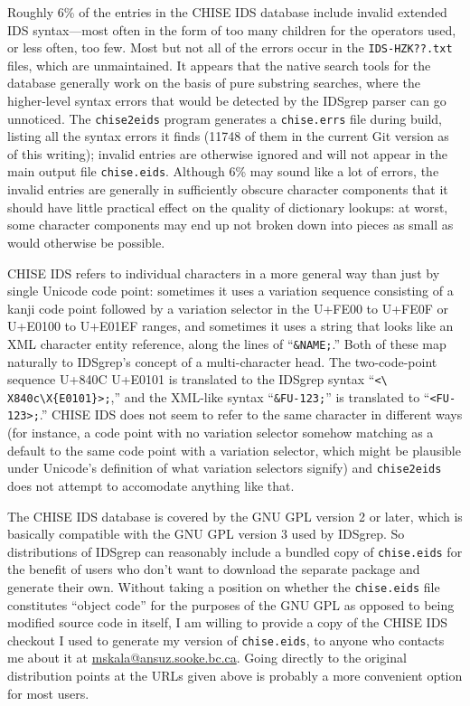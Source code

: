 \documentclass[twocolumn]{report}
\begin{document}
Roughly 6\% of the entries in the CHISE IDS database include invalid
extended IDS syntax---most often in the form of too many children for the
operators used, or less often, too few.  Most but not all of the errors
occur in the \texttt{IDS-HZK??.txt} files, which are unmaintained.  It
appears that the native search tools for the database generally work on the
basis of pure substring searches, where the higher-level syntax errors that
would be detected by the IDSgrep parser can go unnoticed.  The
\texttt{chise2eids} program generates a \texttt{chise.errs} file during
build, listing all the syntax errors it finds (11748 of them in the current
Git version as of this writing); invalid entries are otherwise ignored and
will not appear in the main output file \texttt{chise.eids}.  Although 6\%
may sound like a lot of errors, the invalid entries are generally in
sufficiently obscure character components that it should have little
practical effect on the quality of dictionary lookups: at worst, some
character components may end up not broken down into pieces as small as
would otherwise be possible.

CHISE IDS refers to individual characters in a more general way than just by
single Unicode code point: sometimes it uses a variation sequence consisting
of a kanji code point followed by a variation selector in the U+FE00 to
U+FE0F or U+E0100 to U+E01EF ranges, and sometimes it uses a string that
looks like an XML character entity reference, along the lines of
``\texttt{\&NAME;}.'' Both of these map naturally to IDSgrep's concept of a
multi-character head.  The two-code-point sequence U+840C U+E0101 is
translated to the IDSgrep syntax ``\texttt{<\textbackslash%
X840c\textbackslash X\{E0101\}>;},'' and the XML-like syntax
``\texttt{\&FU-123;}'' is translated to ``\texttt{<FU-123>;}.'' CHISE IDS
does not seem to refer to the same character in different ways (for
instance, a code point with no variation selector somehow matching as a
default to the same code point with a variation selector, which might be
plausible under Unicode's definition of what variation selectors signify)
and \texttt{chise2eids} does not attempt to accomodate anything like that.

The CHISE IDS database is covered by the GNU GPL version 2 or later, which
is basically compatible with the GNU GPL version 3 used by IDSgrep.  So
distributions of IDSgrep can reasonably include a bundled copy of
\texttt{chise.eids} for the benefit of users who don't want to download the
separate package and generate their own.  Without taking a position on
whether the \texttt{chise.eids} file constitutes ``object code'' for the
purposes of the GNU GPL as opposed to being modified source code in itself,
I am willing to provide a copy of the CHISE IDS checkout I used to generate
my version of \texttt{chise.eids}, to anyone who contacts me about it at
\url{mskala@ansuz.sooke.bc.ca}.  Going directly to the original distribution
points at the URLs given above is probably a more convenient option for most
users.
\end{document}
